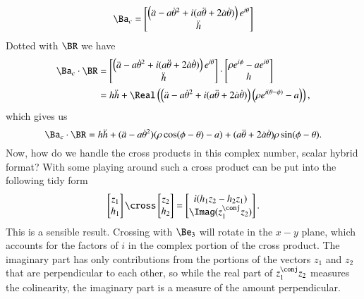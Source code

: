 {%
\begin{equation}\label{eqn:relativisticElectrodynamicsExamReflection:940}
\Ba_c =
\begin{bmatrix}
\left( \ddot{a} - a {\dot{\theta}}^2 + i ( a\ddot{\theta} + 2 \dot{a} \dot{\theta} ) \right) e^{i\theta} \\
\ddot{h}
\end{bmatrix}
\end{equation}
%
Dotted with \(\BR\) we have
%
\begin{equation}\label{eqn:relativisticElectrodynamicsExamReflection:1290}
\begin{aligned}
\Ba_c \cdot \BR
&=
\begin{bmatrix}
\left( \ddot{a} - a {\dot{\theta}}^2 + i ( a\ddot{\theta} + 2 \dot{a} \dot{\theta} ) \right) e^{i\theta} \\
\ddot{h}
\end{bmatrix}
\cdot
\begin{bmatrix}
\rho e^{i\phi} - a e^{i\theta} \\
h
\end{bmatrix} \\
&=
h \ddot{h} + \Real\left(
\left( \ddot{a} - a {\dot{\theta}}^2 + i ( a\ddot{\theta} + 2 \dot{a} \dot{\theta} ) \right) \left(\rho e^{i(\theta- \phi)} - a\right)
\right) ,
\end{aligned}
\end{equation}
%
which gives us
%
\begin{equation}\label{eqn:relativisticElectrodynamicsExamReflection:950}
\Ba_c \cdot \BR =
h \ddot{h} +
( \ddot{a} - a {\dot{\theta}}^2 ) (\rho \cos(\phi - \theta) - a)
+ (a \ddot{\theta} + 2 \dot{a} \dot{\theta}) \rho \sin(\phi - \theta).
\end{equation}
%
Now, how do we handle the cross products in this complex number, scalar hybrid format?  With some playing around such a cross product can be put into the following tidy form
%
\begin{equation}\label{eqn:relativisticElectrodynamicsExamReflection:960}
\begin{bmatrix}
z_1 \\
h_1
\end{bmatrix}
\cross
\begin{bmatrix}
z_2 \\
h_2
\end{bmatrix}
=
\begin{bmatrix}
i (h_1 z_2 - h_2 z_1) \\
\Imag(z_1^\conj z_2)
\end{bmatrix}.
\end{equation}
%
This is a sensible result.  Crossing with \(\Be_3\) will rotate in the \(x-y\) plane, which accounts for the factors of \(i\) in the complex portion of the cross product.  The imaginary part has only contributions from the portions of the vectors \(z_1\) and \(z_2\) that are perpendicular to each other, so while the real part of \(z_1^\conj z_2\) measures the colinearity, the imaginary part is a measure of the amount perpendicular.

}
